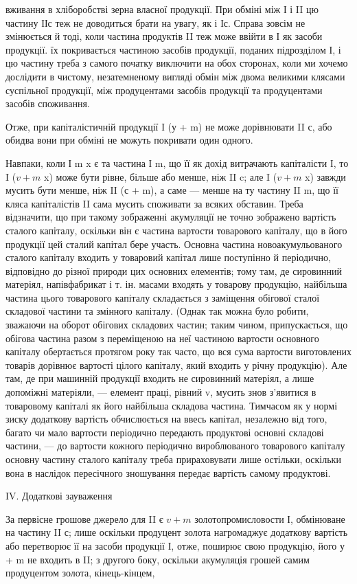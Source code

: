 \parcont{}  %
вживання в хліборобстві зерна власної продукції. При обміні між І і II
цю частину ІІс теж не доводиться брати на увагу, як і Іс. Справа зовсім
не змінюється й тоді, коли частина продуктів II теж може ввійти в І
як засоби продукції. їх покривається частиною засобів продукції, поданих
підрозділом І, і цю частину треба з самого початку виключити на обох
сторонах, коли ми хочемо дослідити в чистому, незатемненому вигляді
обмін між двома великими клясами суспільної продукції, між продуцентами
засобів продукції та продуцентами засобів споживання.

Отже, при капіталістичній продукції І (у + m) не може дорівнювати
II с, або обидва вони при обміні не можуть покривати один одного.

Навпаки, коли І m x є та частина І m, що її як дохід витрачають капіталісти І,
то I ($v + m$ x) може бути рівне, більше або менше, ніж II c; але I ($v + m$ x)
завжди мусить бути менше, ніж II (с + m), а саме — менше на ту частину
II m, що її кляса капіталістів II сама мусить споживати за всяких обставин.
Треба відзначити, що при такому зображенні акумуляції не точно
зображено вартість сталого капіталу, оскільки він є частина вартости
товарового капіталу, що в його продукції цей сталий капітал бере участь.
Основна частина новоакумульованого сталого капіталу входить у товаровий
капітал лише поступінно й періодично, відповідно до різної природи
цих основних елементів; тому там, де сировинний матеріял, напівфабрикат
і т. ін. масами входять у товарову продукцію, найбільша частина
цього товарового капіталу складається з заміщення обігової сталої
складової частини та змінного капіталу. (Однак так можна було робити,
зважаючи на оборот обігових складових частин; таким чином, припускається,
що обігова частина разом з переміщеною на неї частиною вартости основного
капіталу обертається протягом року так часто, що вся сума вартости
виготовлених товарів дорівнює вартості цілого капіталу, який входить у
річну продукцію). Але там, де при машинній продукції входить не сировинний
матеріял, а лише допоміжні матеріяли, — елемент праці, рівний v,
мусить знов з’явитися в товаровому капіталі як його найбільша складова
частина. Тимчасом як у нормі зиску додаткову вартість обчислюється
на ввесь капітал, незалежно від того, багато чи мало вартости періодично
передають продуктові основні складові частини, — до вартости кожного
періодично вироблюваного товарового капіталу основну частину сталого
капіталу треба прираховувати лише остільки, оскільки вона в наслідок
пересічного зношування передає вартість самому продуктові.

IV. Додаткові зауваження

За первісне грошове джерело для II є $v + m$ золотопромисловости І,
обмінюване на частину II с; лише оскільки продуцент золота нагромаджує
додаткову вартість або перетворює її на засоби продукції І, отже,
поширює свою продукцію, його у + m не входить в II; з другого боку,
оскільки акумуляція грошей самим продуцентом золота, кінець-кінцем,
\parbreak{}  %
